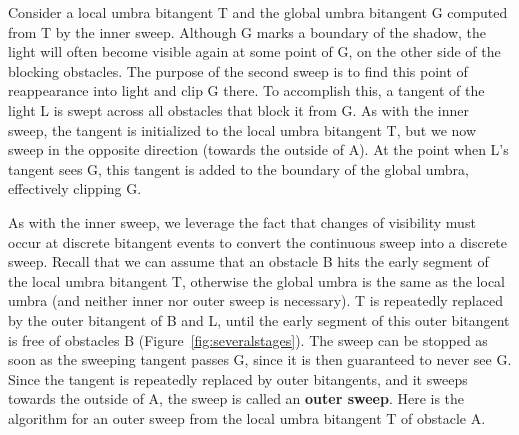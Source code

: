 \documentclass[9pt]{article}
\begin{document}
Consider a local umbra bitangent T and the global umbra bitangent G
computed from T by the inner sweep.
Although G marks a boundary of the shadow,
the light will often become visible again at some point of G,
on the other side of the blocking obstacles.
The purpose of the second sweep is to find this point of reappearance
into light and clip G there.
To accomplish this, a tangent of the light L is swept across 
all obstacles that block it from G.
As with the inner sweep,
the tangent is initialized to the local umbra bitangent T, 
but we now sweep in the opposite direction (towards the outside of A).
At the point when L's tangent sees G, 
this tangent is added to the boundary of the global umbra, effectively clipping G.



As with the inner sweep, we leverage the fact that changes of visibility
must occur at discrete bitangent events
to convert the continuous sweep into a discrete sweep.
Recall that we can assume that an obstacle B hits the early segment of 
the local umbra bitangent T,
otherwise the global umbra is the same as the local umbra
(and neither inner nor outer sweep is necessary).
T is repeatedly replaced by the outer bitangent of B and L,
until the early segment of this outer bitangent is free of obstacles B (Figure~\ref{fig:severalstages}).
The sweep can be stopped as soon as the sweeping tangent passes G,
since it is then guaranteed to never see G.
Since the tangent is repeatedly replaced by outer
bitangents, and it sweeps towards the outside of A,
the sweep is called an {\bf outer sweep}.
Here is the algorithm for an outer sweep from the local umbra bitangent T of obstacle A.

\end{document}
